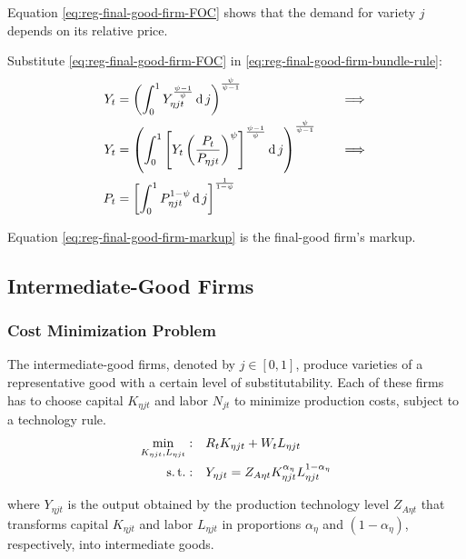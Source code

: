 \documentclass[
	thesis.tex
	]{subfiles}
\begin{document}
Equation \ref{eq:reg-final-good-firm-FOC} shows that the demand for variety $j$ depends on its relative price. 

Substitute \ref{eq:reg-final-good-firm-FOC} in \ref{eq:reg-final-good-firm-bundle-rule}:
\begin{alignat}{2}
	Y_t & = \left( \int_{0}^{1} Y_{\eta jt}^{\frac{\psi-1}{\psi}} \operatorname{d} j \right)^{\frac{\psi}{\psi-1}} &\implies \nonumber \\
	Y_t & = \left( \int_{0}^{1} \left[ Y_t \left( \frac{P_t}{P_{\eta jt}} \right)^{\psi} \right]^{\frac{\psi-1}{\psi}} \operatorname{d} j \right)^{\frac{\psi}{\psi-1}} \quad &\implies \nonumber \\
	P_t & = \left[ \int_{0}^{1} P_{\eta jt}^{1-\psi} \operatorname{d} j \right]^{\frac{1}{1-\psi}} \label{eq:reg-final-good-firm-markup}
\end{alignat}

Equation \ref{eq:reg-final-good-firm-markup} is the final-good firm's markup.


\subsection{Intermediate-Good Firms}

\subsubsection*{Cost Minimization Problem}

The intermediate-good firms, denoted by $j \in [0,1]$, produce varieties of a representative good with a certain level of substitutability. Each of these firms has to choose capital $K_{\eta jt}$ and labor $N_{jt}$ to minimize production costs, subject to a technology rule.
\begin{align}
	\label{eq:reg-int-good-firm-total-cost}
	\min_{K_{\eta jt}, L_{\eta jt}}: \quad & R_t K_{\eta jt} + W_t L_{\eta jt} \\
	\label{eq:reg-int-good-firm-production-function}
	\operatorname{s.t.}: \quad & Y_{\eta jt} = Z_{A\eta t} K_{\eta jt}^{\alpha_\eta} L_{\eta jt}^{1-{\alpha_\eta}}
\end{align}

where $Y_{\eta jt}$ is the output obtained by the production technology level $Z_{A\eta t}$\footnotemark{} that transforms capital $K_{\eta jt}$ and labor $L_{\eta jt}$ in proportions ${\alpha_\eta}$ and $(1-{\alpha_\eta})$, respectively, into intermediate goods.
\end{document}
